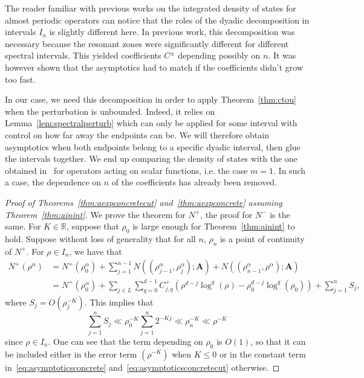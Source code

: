 \documentclass[AHL,Unicode,longabstracts,published]{cedram}
\newcommand{\R}{\mathbb R}
\newcommand{\BA}{\mathbf A}
\newcommand{\bigo}[1]{O\left(#1 \right)}
\begin{document}
\begin{rema}
The reader familiar with previous works on the integrated density of states for almost periodic operators can notice that the roles of the dyadic decomposition in intervals $I_n$ is slightly different here. In previous work, this decomposition was necessary because the resonant zones were significantly different for different spectral intervals. This yielded coefficients $C^\pm$ depending possibly on $n$. It was however shown that the asymptotics had to match if the coefficients didn't grow too fast.

In our case, we need this decomposition in order to apply Theorem~\ref{thm:ctou} when the perturbation is unbounded. Indeed, it relies on Lemma~\ref{lem:spectralperturb} which can only be applied for some interval with control on how far away the endpoints can be. We will therefore obtain asymptotics when both endpoints belong to a specific dyadic interval, then glue the intervals together. We end up comparing the density of states with the one obtained in~\cite{MorParSht2014} for operators acting on scalar functions, i.e. the case $m = 1$. In such a case, the dependence on $n$ of the coefficients has already been removed.
\end{rema}

\begin{proof}[Proof of Theorems~\ref{thm:aexpconcretecut} and~\ref{thm:aexpconcrete} assuming Theorem~\ref{thm:ainint}] We prove the theorem for $N^+$, the proof for $N^-$ is the same. For $K \in \R$, suppose that $\rho_0$ is large enough for Theorem~\ref{thm:ainint} to hold. Suppose without loss of generality that for all $n$, $\rho_n$ is a point of continuity of $N^+$. For $\rho \in I_n$, we have that
\begin{equation}\label{eq:foldingsum}
\begin{aligned}
N^+(\rho^\alpha) &= N^+(\rho_0^\alpha) + \sum_{j=1}^{n-1} N((\rho_{j-1}^\alpha, \rho_j^\alpha);\BA) + N((\rho_{n-1}^\alpha,\rho^\alpha);\BA) \\
&= N^+(\rho_0^\alpha) +
\sum_{j\in L} \sum_{q =0}^{d-1} C_{j,q}^+
\left(\rho^{d-j} \log^q(\rho) - \rho_0^{d-j} \log^q(\rho_0)\right) +
\sum_{j=1}^n S_j,
\end{aligned}
\end{equation}
where $S_j = \bigo{\rho_j^{-K}}$. This implies that
\begin{equation}\label{eq:glued}
\sum_{j=1}^n S_j \ll \rho_0^{-K} \sum_{j = 1}^n 2^{-Kj} \ll \rho_n^{-K} \ll \rho^{-K}
\end{equation}
since $\rho \in I_n$. One can see that the term depending on $\rho_0$ is $\bigo{1}$, so that it can be included either in the error term $(\rho^{-K})$ when $K \le 0$ or in the constant term in~\eqref{eq:asymptoticsconcrete} and~\eqref{eq:asymptoticsconcretecut} otherwise.
\end{proof}
\end{document}
